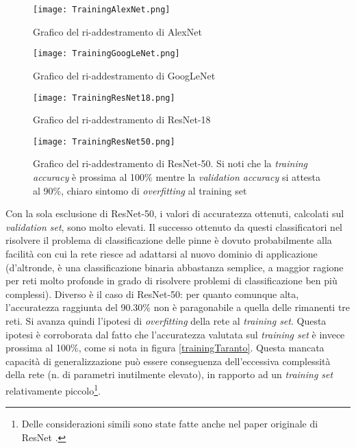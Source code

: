 \begin{figure}[h!]
  \centering
  \texttt{[image: TrainingAlexNet.png]}
  
  \caption{Grafico del ri-addestramento di AlexNet}
  \label{graficoAlexnet}

\end{figure}

\begin{figure}[h!]
  \centering
  \texttt{[image: TrainingGoogLeNet.png]}
  
  \caption{Grafico del ri-addestramento di GoogLeNet}
  \label{graficoGooglenet}

\end{figure}

\begin{figure}[h!]
  \centering
  \texttt{[image: TrainingResNet18.png]}
  
  \caption{Grafico del ri-addestramento di ResNet-18}
  \label{graficoResnet18}

\end{figure}

\begin{figure}[h!]
  \centering
  \texttt{[image: TrainingResNet50.png]}
  
  \caption{Grafico del ri-addestramento di ResNet-50.  Si noti che la \textit{training accuracy} è prossima al 100\% mentre la \textit{validation accuracy} si attesta al 90\%, chiaro sintomo di \textit{overfitting} al training set}
  \label{graficoResnet50}

\end{figure}

Con la sola esclusione di ResNet-50, i valori di accuratezza ottenuti, calcolati sul \textit{validation set}, sono molto elevati. Il successo ottenuto da questi classificatori nel risolvere il problema di classificazione delle pinne è dovuto probabilmente alla facilità con cui la rete riesce ad adattarsi al nuovo dominio di applicazione (d'altronde, è una classificazione binaria abbastanza semplice, a maggior ragione per reti molto profonde in grado di risolvere problemi di classificazione ben più complessi). Diverso è il caso di ResNet-50: per quanto comunque alta, l'accuratezza raggiunta del 90.30\% non è paragonabile a quella delle rimanenti tre reti. Si avanza quindi l'ipotesi di \textit{overfitting} della rete al \textit{training set}. Questa ipotesi è corroborata dal fatto che l'accuratezza valutata sul \textit{training set} è invece prossima al 100\%, come si nota in figura \ref{trainingTaranto}. Questa mancata capacità di generalizzazione può essere conseguenza dell'eccessiva complessità della rete (n. di parametri inutilmente elevato), in rapporto ad un \textit{training set} relativamente piccolo\footnote{Delle considerazioni simili sono state fatte anche nel paper originale di ResNet \cite{resnet}.}.\\


